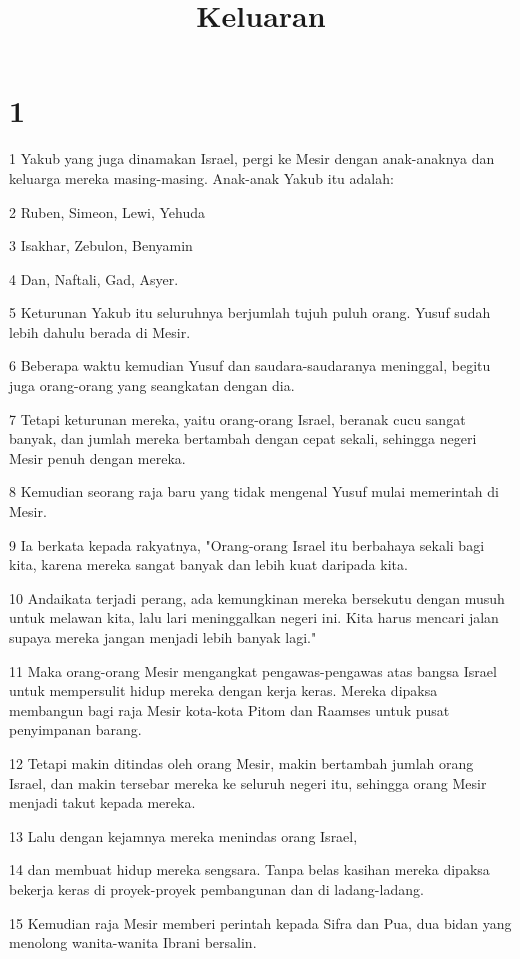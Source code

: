 

\title{Keluaran}


\chapter{1}

\par 1 Yakub yang juga dinamakan Israel, pergi ke Mesir dengan anak-anaknya dan keluarga mereka masing-masing. Anak-anak Yakub itu adalah:
\par 2 Ruben, Simeon, Lewi, Yehuda
\par 3 Isakhar, Zebulon, Benyamin
\par 4 Dan, Naftali, Gad, Asyer.
\par 5 Keturunan Yakub itu seluruhnya berjumlah tujuh puluh orang. Yusuf sudah lebih dahulu berada di Mesir.
\par 6 Beberapa waktu kemudian Yusuf dan saudara-saudaranya meninggal, begitu juga orang-orang yang seangkatan dengan dia.
\par 7 Tetapi keturunan mereka, yaitu orang-orang Israel, beranak cucu sangat banyak, dan jumlah mereka bertambah dengan cepat sekali, sehingga negeri Mesir penuh dengan mereka.
\par 8 Kemudian seorang raja baru yang tidak mengenal Yusuf mulai memerintah di Mesir.
\par 9 Ia berkata kepada rakyatnya, "Orang-orang Israel itu berbahaya sekali bagi kita, karena mereka sangat banyak dan lebih kuat daripada kita.
\par 10 Andaikata terjadi perang, ada kemungkinan mereka bersekutu dengan musuh untuk melawan kita, lalu lari meninggalkan negeri ini. Kita harus mencari jalan supaya mereka jangan menjadi lebih banyak lagi."
\par 11 Maka orang-orang Mesir mengangkat pengawas-pengawas atas bangsa Israel untuk mempersulit hidup mereka dengan kerja keras. Mereka dipaksa membangun bagi raja Mesir kota-kota Pitom dan Raamses untuk pusat penyimpanan barang.
\par 12 Tetapi makin ditindas oleh orang Mesir, makin bertambah jumlah orang Israel, dan makin tersebar mereka ke seluruh negeri itu, sehingga orang Mesir menjadi takut kepada mereka.
\par 13 Lalu dengan kejamnya mereka menindas orang Israel,
\par 14 dan membuat hidup mereka sengsara. Tanpa belas kasihan mereka dipaksa bekerja keras di proyek-proyek pembangunan dan di ladang-ladang.
\par 15 Kemudian raja Mesir memberi perintah kepada Sifra dan Pua, dua bidan yang menolong wanita-wanita Ibrani bersalin.
